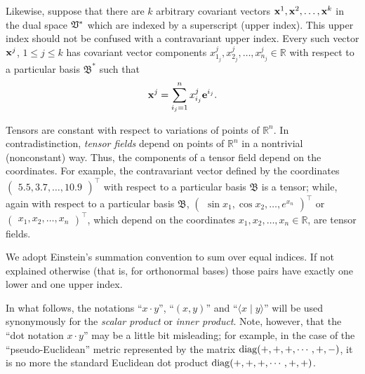 Likewise, suppose that there are $k$ arbitrary covariant vectors ${\bf x}^1,{\bf x}^2,\ldots ,{\bf x}^k$ in the dual space ${\frak V}^\ast$ which are indexed by a superscript
(upper index). This upper index should not be confused with a contravariant upper index.
Every such vector ${\bf x}^j$, $1 \le j \le k$ has covariant vector components
$x_{1_j}^j, x_{2_j}^j, \ldots , x_{n_j}^j \in \mathbb{R}$
with respect to a particular basis ${\mathfrak B}^\ast$
such that
\begin{equation}
{\bf x}^j =\sum_{{i_j}=1}^n x_{i_j}^j{\bf e}^{{i_j}}.
\label{2016-m-tensor-covvs}
\end{equation}

Tensors are constant with respect to variations of points of $\mathbb{R}^n$.
In contradistinction, {\em tensor fields} depend on points of $\mathbb{R}^n$ in a nontrivial (nonconstant) way.
Thus, the components of a tensor field
depend on the coordinates.
{
\color{blue}
\bexample
For example, the contravariant vector defined by the coordinates
$
\begin{pmatrix}
5.5,
3.7,
\ldots ,
10.9
\end{pmatrix}^\intercal
$
with respect to a particular basis ${\mathfrak B}$
is a tensor; while, again with respect to a particular basis ${\mathfrak B}$,
$
\begin{pmatrix}
\sin x_1,
\cos x_2,
\ldots ,
e^{x_n}
\end{pmatrix}^\intercal
$ or
$
\begin{pmatrix}
x_1,
x_2,
\ldots ,
x_n
\end{pmatrix}^\intercal
$,
which depend on the coordinates $x_1, x_2, \ldots , x_n \in \mathbb{R}$,
are tensor fields.
\eexample
}


We adopt Einstein's summation convention to sum over equal indices.
If not explained otherwise (that is, for orthonormal bases) those pairs have exactly one lower and one upper index.


In what follows, the notations
``$x\cdot y$'',
``$(x,y)$'' and
``$\langle x\mid y\rangle $'' will be used synonymously for the {\em
scalar product}
or
{\em inner product}.
Note, however, that the ``dot notation $x\cdot y$''
may be a little bit misleading; for example, in the case of the ``pseudo-Euclidean'' metric
represented by the matrix
 ${\rm diag}(+,+,+,\cdots ,+,-)$, it is no more the standard Euclidean dot product
${\rm diag}(+,+,+,\cdots ,+,+)$.



